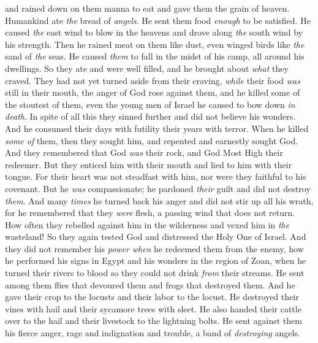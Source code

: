 \begin{biblechapter}
\verse and rained down on them manna to eat 
and gave them the grain of heaven.
\verse Humankind ate \textit{the} bread of \textit{angels}. 
He sent them food \textit{enough} to be satisfied.
\verse He caused \textit{the} east wind to blow in the heavens 
and drove along \textit{the} south wind by his strength.
\verse Then he rained meat on them like dust, 
even winged birds like \textit{the} sand of \textit{the} seas.
\verse He caused \textit{them} to fall in the midst of his camp, 
all around his dwellings.
\verse So they ate and were well filled, 
and he brought about \textit{what} they craved.
\verse They had not yet turned aside from their craving, 
\textit{while} their food \textit{was} still in their mouth,
\verse the anger of God rose against them, 
and he killed some of the stoutest of them, 
even the young men of Israel he caused to bow down \textit{in death}.
\verse In spite of all this they sinned further 
and did not believe his wonders.
\verse And he consumed their days with futility  
their years with terror.
\verse When he killed \textit{some of} them, then they sought him, 
and repented and earnestly sought God.
\verse And they remembered that God \textit{was} their rock, 
and God Most High their redeemer.
\verse But they enticed him with their mouth 
and lied to him with their tongue.
\verse For their heart was not steadfast with him, 
nor were they faithful to his covenant.
\verse But he \textit{was} compassionate; he pardoned \textit{their} guilt 
and did not destroy \textit{them}. 
And many \textit{times} he turned back his anger 
and did not stir up all his wrath,
\verse for he remembered that they \textit{were} flesh, 
a passing wind that does not return.
\verse How often they rebelled against him in the wilderness 
and vexed him in \textit{the} wasteland!
\verse So they again tested God 
and distressed the Holy One of Israel.
\verse And they did not remember his \textit{power} 
\textit{when} he redeemed them from the enemy,
\verse how he performed his signs in Egypt 
and his wonders in the region of Zoan,
\verse when he turned their rivers to blood 
so they could not drink \textit{from} their streams.
\verse He sent among them flies that devoured them 
and frogs that destroyed them.
\verse And he gave their crop to the locusts 
and their labor to the locust.
\verse He destroyed their vines with hail 
and their sycamore trees with sleet.
\verse He also handed their cattle over to the hail 
and their livestock to the lightning bolts.
\verse He sent against them his fierce anger, 
rage and indignation and trouble, 
a band of \textit{destroying} angels.

\end{biblechapter}
